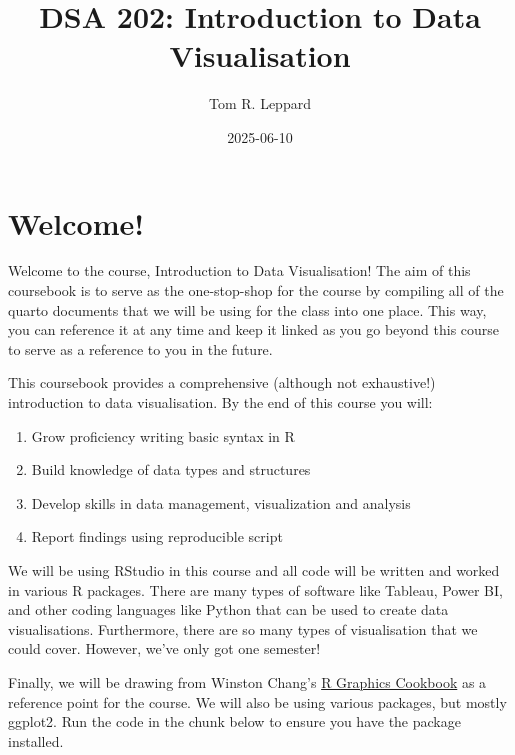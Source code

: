 \documentclass[
  letterpaper,
  DIV=11,
  numbers=noendperiod]{scrreprt}
\title{DSA 202: Introduction to Data Visualisation}
\author{Tom R. Leppard}
\date{2025-06-10}
\renewcommand*\contentsname{Table of contents}
\newcommand\contentsname{Table of contents}
\begin{document}
\maketitle

\renewcommand*\contentsname{Table of contents}
{
\hypersetup{linkcolor=}
\setcounter{tocdepth}{2}
\tableofcontents
}


\chapter*{Welcome!}\label{welcome}


Welcome to the course, Introduction to Data Visualisation! The aim of
this coursebook is to serve as the one-stop-shop for the course by
compiling all of the quarto documents that we will be using for the
class into one place. This way, you can reference it at any time and
keep it linked as you go beyond this course to serve as a reference to
you in the future.

This coursebook provides a comprehensive (although not exhaustive!)
introduction to data visualisation. By the end of this course you will:

\begin{enumerate}
\def\labelenumi{\arabic{enumi}.}
\item
  Grow proficiency writing basic syntax in R
\item
  Build knowledge of data types and structures
\item
  Develop skills in data management, visualization and analysis
\item
  Report findings using reproducible script
\end{enumerate}

We will be using RStudio in this course and all code will be written and
worked in various R packages. There are many types of software like
Tableau, Power BI, and other coding languages like Python that can be
used to create data visualisations. Furthermore, there are so many types
of visualisation that we could cover. However, we've only got one
semester!

Finally, we will be drawing from Winston Chang's
\href{https://r-graphics.org/}{R Graphics Cookbook} as a reference point
for the course. We will also be using various packages, but mostly
ggplot2. Run the code in the chunk below to ensure you have the package
installed.
\end{document}
